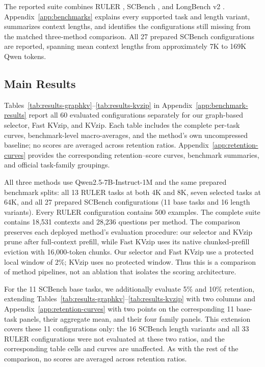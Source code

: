 \documentclass{article} %
\begin{document}
The reported suite combines RULER \citep{hsieh2024ruler}, SCBench
\citep{li2025scbench}, and LongBench v2 \citep{bai2024longbenchv2}.
Appendix~\ref{app:benchmarks} explains every supported
task and length variant, summarizes context lengths, and identifies the
configurations still missing from the
matched three-method comparison. All 27 prepared SCBench configurations
are reported, spanning mean context lengths from approximately 7K to 169K
Qwen tokens.

\subsection{Main Results}
\label{sec:main-results}

Tables~\ref{tab:results-graphkv}--\ref{tab:results-kvzip} in
Appendix~\ref{app:benchmark-results} report all 60 evaluated configurations
separately for our graph-based selector, Fast KVzip, and KVzip. Each table
includes the complete per-task curves, benchmark-level macro-averages, and
the method's own uncompressed baseline; no scores are averaged across
retention ratios. Appendix~\ref{app:retention-curves} provides the corresponding
retention--score curves, benchmark summaries, and official task-family groupings.

All three methods use Qwen2.5-7B-Instruct-1M and the same prepared benchmark
splits: all 13 RULER tasks at both 4K and 8K, seven selected tasks at 64K,
and all 27 prepared SCBench configurations (11 base tasks and 16 length
variants). Every RULER configuration contains 500
examples. The complete suite contains 18,531 contexts and 28,236 questions
per method. The comparison preserves each deployed method's evaluation
procedure: our selector and KVzip prune after full-context prefill, while
Fast KVzip uses its native chunked-prefill eviction with 16,000-token
chunks. Our selector and Fast KVzip use a protected local window of 2\%;
KVzip uses no protected window. Thus this is a comparison of method
pipelines, not an ablation that isolates the scoring architecture.

For the 11 SCBench base tasks, we additionally evaluate 5\% and 10\%
retention, extending Tables~\ref{tab:results-graphkv}--\ref{tab:results-kvzip}
with two columns and Appendix~\ref{app:retention-curves} with two points on
the corresponding 11 base-task panels, their aggregate mean, and their four
family panels. This extension covers these 11 configurations only: the 16
SCBench length variants and all 33 RULER configurations were not evaluated
at these two ratios, and the corresponding table cells and curves are
unaffected. As with the rest of the comparison, no scores are averaged
across retention ratios.
\end{document}
